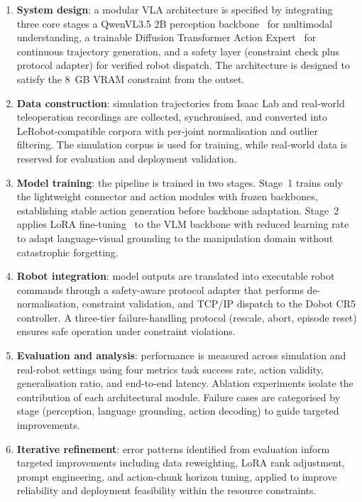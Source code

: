 \begin{enumerate}
    \item \textbf{System design}: a modular VLA architecture is specified by
    integrating three core stages  a QwenVL3.5 2B perception
    backbone~\cite{qwen3vl2025} for multimodal understanding, a trainable Diffusion
    Transformer Action Expert~\cite{peebles2023dit} for continuous trajectory
    generation, and a safety layer (constraint check plus protocol adapter) for
    verified robot dispatch. The architecture is designed to satisfy the 8~GB VRAM
    constraint from the outset.

    \item \textbf{Data construction}: simulation trajectories from Isaac Lab and
    real-world teleoperation recordings are collected, synchronised, and converted
    into LeRobot-compatible corpora with per-joint normalisation and outlier
    filtering. The simulation corpus is used for training, while real-world data is
    reserved for evaluation and deployment validation.

    \item \textbf{Model training}: the pipeline is trained in two stages. Stage~1
    trains only the lightweight connector and action modules with frozen backbones,
    establishing stable action generation before backbone adaptation. Stage~2 applies
    LoRA fine-tuning~\cite{hu2022lora} to the VLM backbone with reduced learning
    rate to adapt language-visual grounding to the manipulation domain without
    catastrophic forgetting.

    \item \textbf{Robot integration}: model outputs are translated into executable
    robot commands through a safety-aware protocol adapter that performs
    de-normalisation, constraint validation, and TCP/IP dispatch to the Dobot CR5
    controller. A three-tier failure-handling protocol (rescale, abort, episode
    reset) ensures safe operation under constraint violations.

    \item \textbf{Evaluation and analysis}: performance is measured across simulation
    and real-robot settings using four metrics  task success rate, action validity,
    generalisation ratio, and end-to-end latency. Ablation experiments isolate the
    contribution of each architectural module. Failure cases are categorised by stage
    (perception, language grounding, action decoding) to guide targeted improvements.

    \item \textbf{Iterative refinement}: error patterns identified from evaluation
    inform targeted improvements including data reweighting, LoRA rank adjustment,
    prompt engineering, and action-chunk horizon tuning, applied to improve
    reliability and deployment feasibility within the resource constraints.
\end{enumerate}



